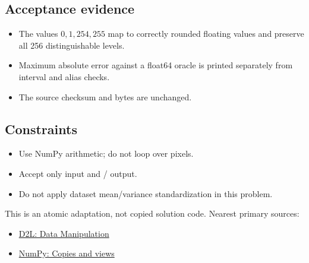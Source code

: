         \subsection{Acceptance evidence}

        \begin{evidencebox}
        \begin{itemize}
          \item The values $0,1,254,255$ map to correctly rounded floating values and preserve all 256 distinguishable levels.
  \item Maximum absolute error against a float64 oracle is printed separately from interval and alias checks.
  \item The source checksum and bytes are unchanged.
        \end{itemize}
        \end{evidencebox}

        \subsection{Constraints}

        \begin{itemize}
          \item Use NumPy arithmetic; do not loop over pixels.
  \item Accept only  input and / output.
  \item Do not apply dataset mean/variance standardization in this problem.
        \end{itemize}

        \begin{sourcebox}
        This is an atomic adaptation, not copied solution code. Nearest primary sources:
        \begin{itemize}
          \item \href{https://d2l.ai/chapter_preliminaries/ndarray.html}{D2L: Data Manipulation}
  \item \href{https://numpy.org/doc/stable/user/basics.copies.html}{NumPy: Copies and views}
        \end{itemize}
        \end{sourcebox}
